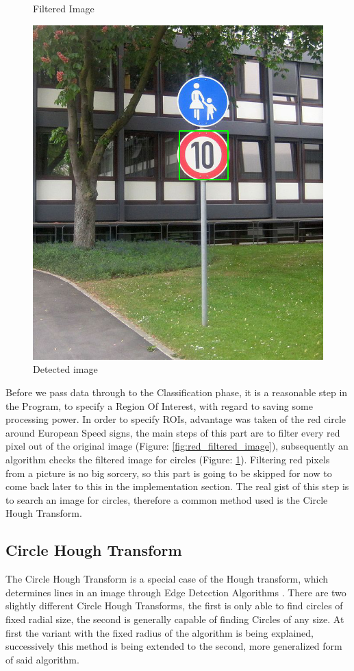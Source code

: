 \begin{figure}[H]
	\caption{Filtered Image}\label{fig:red_filtered_image}
	\endminipage\hfill
	\includegraphics[width=\linewidth]{images/detectedimg.png}
	\caption{Detected image}\label{fig:detected_image}
	\endminipage
\end{figure}
Before we pass data through to the Classification phase, it is a reasonable step in the Program, to specify a Region Of Interest, with regard to saving some processing power. In order to specify ROIs, advantage was taken of the red circle around European Speed signs, the main steps of this part are to filter every red pixel out of the original image (Figure: \ref{fig:red_filtered_image}), subsequently an algorithm checks the filtered image for circles (Figure: \ref{fig:detected_image}). Filtering red pixels from a picture is no big sorcery, so this part is going to be skipped for now to come back later to this in the implementation section. The real gist of this step is to search an image for circles, therefore a common method used is the Circle Hough Transform. 

\subsection{Circle Hough Transform}
The Circle Hough Transform is a special case of the Hough transform, which determines lines in an image through Edge Detection Algorithms \cite{circlehough}. There are two slightly different Circle Hough Transforms, the first is only able to find circles of fixed radial size, the second is generally capable of finding Circles of any size. At first the variant with the fixed radius  of the algorithm is being explained, successively this method is being extended to the second, more generalized form of said algorithm.

